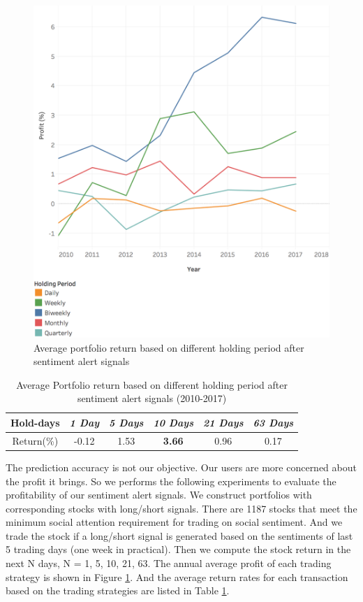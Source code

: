 \documentclass[conference]{IEEEtran}
\begin{document}
\begin{figure}[tb]
\centerline{\includegraphics[width=0.9\columnwidth]{pics/annualprofit.png}}
\caption{Average portfolio return based on different holding period after sentiment alert signals}
\label{profitfigure}
\end{figure}

\begin{table}[tb]
\caption{Average Portfolio return based on different holding period after sentiment alert signals (2010-2017)}
\begin{center}
\begin{tabular}{|c|c|c|c|c|c|}
\hline
\textbf{Hold-days} & \textbf{\textit{1 Day}}& \textbf{\textit{5 Days}}& \textbf{\textit{10 Days}} & \textbf{\textit{21 Days}} & \textbf{\textit{63 Days}} \\
\hline
Return(\%) & -0.12 & 1.53 & \textbf{3.66} & 0.96 & 0.17 \\
\hline
\end{tabular}
\label{profit}
\end{center}
\end{table}

The prediction accuracy is not our objective. Our users are more concerned about the profit it brings. So we performs the following experiments to evaluate the profitability of our sentiment alert signals. We construct portfolios with corresponding stocks with long/short signals. There are 1187 stocks that meet the minimum social attention requirement for trading on social sentiment. And we trade the stock if a long/short signal is generated based on the sentiments of last 5 trading days (one week in practical). Then we compute the stock return in the next N days, N = 1, 5, 10, 21, 63. The annual average profit of each trading strategy is shown in Figure \ref{profitfigure}. And the average return rates for each transaction based on the trading strategies are listed in Table \ref{profit}.
\end{document}
